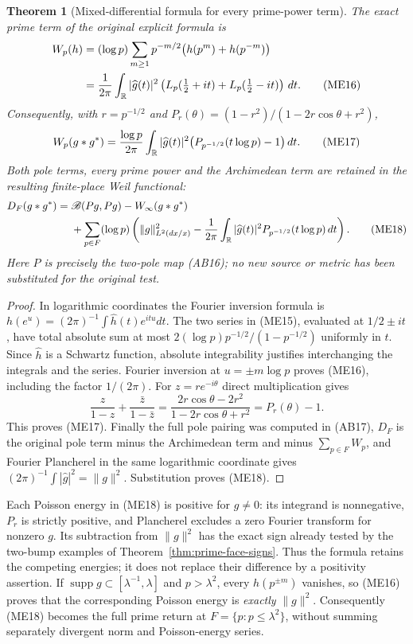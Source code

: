 \documentclass[11pt,a4paper]{article}
\newtheorem{theorem}{Theorem}[section]
\theoremstyle{definition}\newtheorem{definition}[theorem]{Definition}
\newcommand{\supp}{\operatorname{supp}}\newcommand{\tr}{\operatorname{tr}}
\begin{document}
\begin{theorem}[Mixed-differential formula for every prime-power term]
\label{thm:ME-Weil-prime}
The exact prime term of the original explicit formula is
\begin{align}
 W_p(h)&=(\log p)\sum_{m\ge1}p^{-m/2}
       \bigl(h(p^m)+h(p^{-m})\bigr)\notag\\
 &=\frac1{2\pi}\int_\mathbb R |\widehat g(t)|^2
 \left(L_p(\tfrac12+it)+L_p(\tfrac12-it)\right)\,dt.
 \tag{ME16}\label{eq:ME-Weil-prime}
\end{align}
Consequently, with $r=p^{-1/2}$ and
$P_r(\theta)=(1-r^2)/(1-2r\cos\theta+r^2)$,
\[
 W_p(g*g^*)=\frac{\log p}{2\pi}\int_\mathbb R
 |\widehat g(t)|^2\bigl(P_{p^{-1/2}}(t\log p)-1\bigr)\,dt.
 \tag{ME17}\label{eq:ME-poisson}
\]
Both pole terms, every prime power and the Archimedean term are retained
in the resulting finite-place Weil functional:
\begin{align}
 D_F(g*g^*)={}&\mathscr B(Pg,Pg)-W_\infty(g*g^*)\notag\\
 &+\sum_{p\in F}(\log p)\left(
 \|g\|_{L^2(dx/x)}^2-
 \frac1{2\pi}\int_\mathbb R|\widehat g(t)|^2
 P_{p^{-1/2}}(t\log p)\,dt\right).
 \tag{ME18}\label{eq:ME-complete-prime-receiver}
\end{align}
Here $P$ is precisely the two-pole map (AB16); no new source or metric
has been substituted for the original test.
\end{theorem}
\begin{proof}
In logarithmic coordinates the Fourier inversion formula is
$h(e^u)=(2\pi)^{-1}\int\widehat h(t)e^{itu}dt$.
The two series in (ME15), evaluated at $1/2\pm it$, have total absolute
sum at most $2(\log p)p^{-1/2}/(1-p^{-1/2})$ uniformly in $t$.
Since $\widehat h$ is a Schwartz function, absolute integrability justifies
interchanging the integrals and the series. Fourier inversion at
$u=\pm m\log p$ proves (ME16), including the factor $1/(2\pi)$.
For $z=re^{-i\theta}$ direct multiplication gives
\[
 \frac{z}{1-z}+\frac{\bar z}{1-\bar z}
 =\frac{2r\cos\theta-2r^2}{1-2r\cos\theta+r^2}
 =P_r(\theta)-1.
 \tag{ME19}
\]
This proves (ME17). Finally the full pole pairing was computed in (AB17),
$D_F$ is the original pole term minus the Archimedean term and minus
$\sum_{p\in F}W_p$, and Fourier Plancherel in the same logarithmic
coordinate gives $(2\pi)^{-1}\int|\widehat g|^2=\|g\|^2$.
Substitution proves (ME18).
\end{proof}

Each Poisson energy in (ME18) is positive for $g\ne0$: its integrand is
nonnegative, $P_r$ is strictly positive, and Plancherel excludes a zero
Fourier transform for nonzero $g$. Its subtraction from $\|g\|^2$ has
the exact sign already tested by the two-bump examples of
Theorem~\ref{thm:prime-face-signs}. Thus the formula retains the
competing energies; it does not replace their difference by a positivity
assertion. If $\supp g\subset[\lambda^{-1},\lambda]$ and
$p>\lambda^2$, every $h(p^{\pm m})$ vanishes, so (ME16) proves that
the corresponding Poisson energy is \emph{exactly} $\|g\|^2$.
Consequently (ME18) becomes the full prime return at
$F=\{p:p\le\lambda^2\}$, without summing separately divergent
norm and Poisson-energy series.
\end{document}
